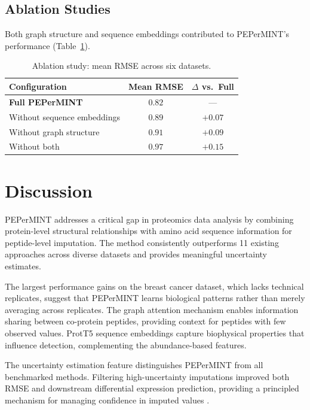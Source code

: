 \documentclass[11pt]{article}
\begin{document}
\subsection{Ablation Studies}

Both graph structure and sequence embeddings contributed to PEPerMINT's performance (Table~\ref{tab:ablation}).

\begin{table}[H]
\centering
\caption{Ablation study: mean RMSE across six datasets.}
\label{tab:ablation}
\begin{tabular}{@{}lcc@{}}
\toprule
Configuration & Mean RMSE & $\Delta$ vs.\ Full \\
\midrule
\textbf{Full PEPerMINT} & $\mathbf{0.82}$ & --- \\
Without sequence embeddings & $0.89$ & $+0.07$ \\
Without graph structure & $0.91$ & $+0.09$ \\
Without both & $0.97$ & $+0.15$ \\
\bottomrule
\end{tabular}
\end{table}

\section{Discussion}

PEPerMINT addresses a critical gap in proteomics data analysis by combining protein-level structural relationships with amino acid sequence information for peptide-level imputation. The method consistently outperforms 11 existing approaches across diverse datasets and provides meaningful uncertainty estimates.

The largest performance gains on the breast cancer dataset, which lacks technical replicates, suggest that PEPerMINT learns biological patterns rather than merely averaging across replicates. The graph attention mechanism \citep{velickovic2018graph} enables information sharing between co-protein peptides, providing context for peptides with few observed values. ProtT5 sequence embeddings \citep{elnaggar2021prottrans} capture biophysical properties that influence detection, complementing the abundance-based features.

The uncertainty estimation feature distinguishes PEPerMINT from all benchmarked methods. Filtering high-uncertainty imputations improved both RMSE and downstream differential expression prediction, providing a principled mechanism for managing confidence in imputed values \citep{gal2016dropout}.
\end{document}
